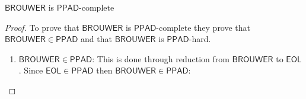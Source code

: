 \documentclass[11pt]{article}
\newcommand{\PPAD}{\mathsf{PPAD}}
\newcommand{\PPADc}{\mathsf{PPAD}\text{-complete}}
\newcommand{\eol}{\mathsf{EOL}}
\begin{document}
\begin{lemma}
    \label{Brouwerc}
     $\mathsf{BROUWER}$ is $\PPADc$
\end{lemma}
\begin{proof}
    To prove that $\mathsf{BROUWER}$ is $\PPADc$ they prove that $\mathsf{BROUWER} \in \PPAD$ and that $\mathsf{BROUWER}$ is $\PPAD$-hard.
    \begin{enumerate}
        \item $\mathsf{BROUWER} \in \PPAD$: This is done through reduction from $\mathsf{BROUWER}$ to $\eol$. Since $\eol \in \PPAD$ then $\mathsf{BROUWER}\in \PPAD$:\\
            


\end{enumerate}
\end{proof}
\end{document}
